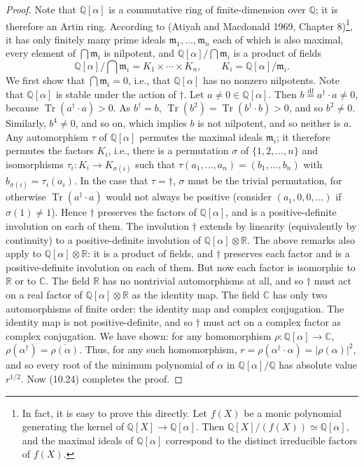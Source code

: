 \documentclass[11pt]{article}
\DeclareMathOperator{\AVTr}{Tr}
\newcommand{\AVQ}{\mathbb{Q}}
\newcommand{\AVR}{\mathbb{R}}
\newcommand{\AVC}{\mathbb{C}}
\begin{document}
\begin{proof}
Note that $\AVQ[\alpha]$ is a commutative ring of finite-dimension over
$\AVQ$; it is therefore an Artin ring. According to (Atiyah and
Macdonald 1969, Chapter 8)\footnote[1]{In fact, it is easy to prove this
directly. Let $f(X)$ be a monic polynomial generating the kernel of
$\AVQ[X]\to\AVQ[\alpha]$. Then
$\AVQ[X]/(f(X))\simeq\AVQ[\alpha]$, and the maximal ideals of
$\AVQ[\alpha]$ correspond to the distinct irreducible factors of $f(X)$.},
it has only finitely many prime ideals $\mathfrak m_1,\ldots,\mathfrak m_n$
each of which is also maximal, every element of $\bigcap\mathfrak m_i$
is nilpotent, and $\AVQ[\alpha]/\bigcap\mathfrak m_i$ is a product of fields
\[
\AVQ[\alpha]/\bigcap\mathfrak m_i=K_1\times\cdots\times K_n,
\qquad K_i=\AVQ[\alpha]/\mathfrak m_i.
\]
We first show that $\bigcap\mathfrak m_i=0$, i.e., that $\AVQ[\alpha]$
has no nonzero nilpotents. Note that $\AVQ[\alpha]$ is stable under the
action of $\dagger$. Let $a\ne0\in\AVQ[\alpha]$. Then
$b\overset{\mathrm{df}}=a^{\dagger}\cdot a\ne0$, because
$\AVTr(a^{\dagger}\cdot a)>0$. As $b^{\dagger}=b$,
$\AVTr(b^2)=\AVTr(b^{\dagger}\cdot b)>0$, and so $b^2\ne0$.
Similarly, $b^4\ne0$, and so on, which implies $b$ is not nilpotent,
and so neither is $a$. Any automorphism $\tau$ of $\AVQ[\alpha]$
permutes the maximal ideals $\mathfrak m_i$; it therefore permutes the
factors $K_i$, i.e., there is a permutation $\sigma$ of
$\{1,2,\ldots,n\}$ and isomorphisms $\tau_i:K_i\to K_{\sigma(i)}$
such that $\tau(a_1,\ldots,a_n)=(b_1,\ldots,b_n)$ with
$b_{\sigma(i)}=\tau_i(a_i)$. In the case that $\tau=\dagger$,
$\sigma$ must be the trivial permutation, for otherwise
$\AVTr(a^{\dagger}\cdot a)$ would not always be positive (consider
$(a_1,0,0,\ldots)$ if $\sigma(1)\ne1$). Hence $\dagger$ preserves
the factors of $\AVQ[\alpha]$, and is a positive-definite involution
on each of them. The involution $\dagger$ extends by linearity
(equivalently by continuity) to a positive-definite involution of
$\AVQ[\alpha]\otimes\AVR$. The above remarks also apply to
$\AVQ[\alpha]\otimes\AVR$: it is a product of fields, and $\dagger$
preserves each factor and is a positive-definite involution on each of
them. But now each factor is isomorphic to $\AVR$ or to $\AVC$.
The field $\AVR$ has no nontrivial automorphisms at all, and so
$\dagger$ must act on a real factor of $\AVQ[\alpha]\otimes\AVR$ as
the identity map. The field $\AVC$ has only two automorphisms of finite
order: the identity map and complex conjugation. The identity map is not
positive-definite, and so $\dagger$ must act on a complex factor as
complex conjugation. We have shown: for any homomorphism
$\rho:\AVQ[\alpha]\to\AVC$,
$\rho(\alpha^{\dagger})=\overline{\rho(\alpha)}$.
Thus, for any such homomorphism,
$r=\rho(\alpha^{\dagger}\cdot\alpha)=\lvert\rho(\alpha)\rvert^2$,
and so every root of the minimum polynomial of $\alpha$ in
$\AVQ[\alpha]/\AVQ$ has absolute value $r^{1/2}$.
Now (10.24) completes the proof.
\end{proof}
\end{document}
